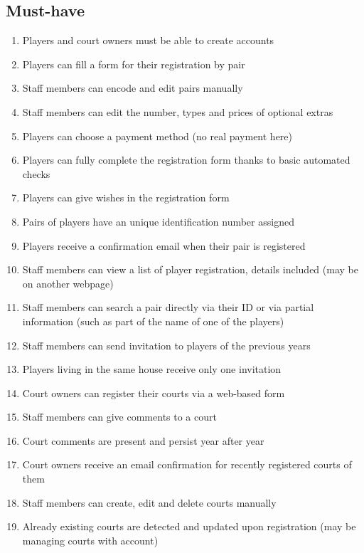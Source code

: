 \subsection{Must-have}

\begin{enumerate}
    \item Players and court owners must be able to create accounts
    \item Players can fill a form for their registration by pair
    \item Staff members can encode and edit pairs manually
    \item Staff members can edit the number, types and prices of
        optional extras
    \item Players can choose a payment method (no real payment here)
    \item Players can fully complete the registration form thanks to
        basic automated checks
    \item Players can give wishes in the registration form
    \item Pairs of players have an unique identification number assigned
    \item Players receive a confirmation email when their pair is
        registered
    \item Staff members can view a list of player registration, details
        included (may be on another webpage)
    \item Staff members can search a pair directly via their ID or via
        partial information (such as part of the name of one of the
        players)
    \item Staff members can send invitation to players of the previous
        years
    \item Players living in the same house receive only one invitation
    \item Court owners can register their courts via a web-based form
    \item Staff members can give comments to a court
    \item Court comments are present and persist year after year
    \item Court owners receive an email confirmation for recently
        registered courts of them
    \item Staff members can create, edit and delete courts manually
    \item Already existing courts are detected and updated upon
        registration (may be managing courts with account)

\end{enumerate}
